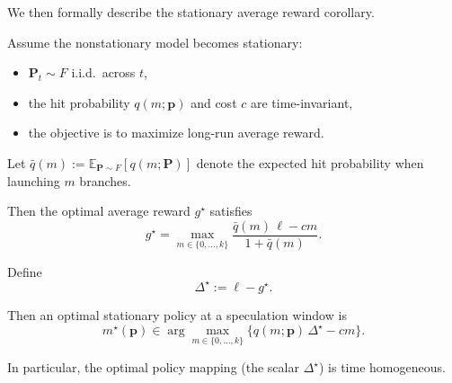 
We then formally describe the stationary average reward corollary. 
\begin{corollary}
Assume the nonstationary model becomes stationary:
\begin{itemize}
    \item $\mathbf P_t \sim F$ i.i.d.\ across $t$,
    \item the hit probability $q(m;\mathbf p)$ and cost $c$ are time-invariant,
    \item the objective is to maximize long-run average reward.
\end{itemize}

Let $\bar q(m) := \mathbb E_{\mathbf P \sim F}[q(m;\mathbf P)]$ denote
the expected hit probability when launching $m$ branches.

Then the optimal average reward $g^\star$ satisfies
\[
g^\star
=
\max_{m \in \{0,\dots,k\}}
\frac{\bar q(m)\,\ell - c m}{1 + \bar q(m)}.
\]

Define
\[
\Delta^\star := \ell - g^\star.
\]

Then an optimal stationary policy at a speculation window is
\[
m^\star(\mathbf p)
\in
\arg\max_{m \in \{0,\dots,k\}}
\{ q(m;\mathbf p)\,\Delta^\star - c m \}.
\]

In particular, the optimal policy mapping (the scalar $\Delta^\star$) is time homogeneous.
\end{corollary}


